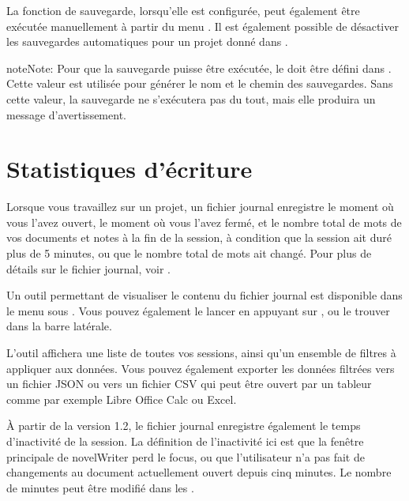 \documentclass[a4paper,11pt,french]{sphinxmanual}
\begin{document}
\sphinxAtStartPar
La fonction de sauvegarde, lorsqu’elle est configurée, peut également être exécutée manuellement à partir du menu . Il est également possible de désactiver les sauvegardes automatiques pour un projet donné dans .

\begin{sphinxadmonition}{note}{Note:}
\sphinxAtStartPar
Pour que la sauvegarde puisse être exécutée, le  doit être défini dans . Cette valeur est utilisée pour générer le nom et le chemin des sauvegardes. Sans cette valeur, la sauvegarde ne s’exécutera pas du tout, mais elle produira un message d’avertissement.
\end{sphinxadmonition}


\section{Statistiques d’écriture}
\label{\detokenize{project_overview:writing-statistics}}\label{\detokenize{project_overview:a-proj-stats}}
\sphinxAtStartPar
Lorsque vous travaillez sur un projet, un fichier journal enregistre le moment où vous l’avez ouvert, le moment où vous l’avez fermé, et le nombre total de mots de vos documents et notes à la fin de la session, à condition que la session ait duré plus de 5 minutes, ou que le nombre total de mots ait changé. Pour plus de détails sur le fichier journal, voir {\hyperref[\detokenize{tech_storage:a-storage}]{}}.

\sphinxAtStartPar
Un outil permettant de visualiser le contenu du fichier journal est disponible dans le menu  sous . Vous pouvez également le lancer en appuyant sur , ou le trouver dans la barre latérale.

\sphinxAtStartPar
L’outil affichera une liste de toutes vos sessions, ainsi qu’un ensemble de filtres à appliquer aux données. Vous pouvez également exporter les données filtrées vers un fichier JSON ou vers un fichier CSV qui peut être ouvert par un tableur comme par exemple Libre Office Calc ou Excel.

\sphinxAtStartPar
{}À partir de la version 1.2, le fichier journal enregistre également le temps d’inactivité de la session. La définition de l’inactivité ici est que la fenêtre principale de novelWriter perd le focus, ou que l’utilisateur n’a pas fait de changements au document actuellement ouvert depuis cinq minutes. Le nombre de minutes peut être modifié dans les .
\end{document}
